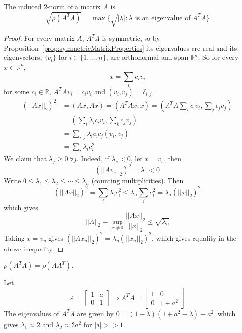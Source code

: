 \begin{theorem}
	The induced $2$-norm of a matrix $A$ is
	\[
		\sqrt{\rho(A^T A)} = \max \{ \sqrt{|\lambda|}: \lambda \text{ is an eigenvalue of } A^T A \}
	\]
\end{theorem}

\begin{proof}
	For every matrix $A$, $A^T A$ is symmetric, so by Proposition~\ref{prop:symmetricMatrixProperties} its eigenvalues are real and its eigenvectors, $\{ v_i \}$ for $i \in \{ 1, \dots, n \}$, are orthonormal and span $\mathbb{R}^n$. So for every $x \in \mathbb{R}^n$,
	\[
		x = \sum_i c_i v_i
	\]
	for some $c_i \in \mathbb{R}$, $A^T A v_i = c_i v_i$ and $(v_i, v_j) = \delta_{i, j}$.
	\[
		\begin{aligned}
			{(||Ax||_2)}^2
				& = (Ax, Ax) = (A^T A x, x) = \left( A^T A \sum_i c_i v_i, \sum_j c_j v_j \right) \\
				& = \left( \sum_i \lambda_i c_i v_i, \sum_k c_j v_j \right) \\
				& = \sum_{i, j} \lambda_i c_i c_j (v_i, v_j) \\
				& = \sum_i \lambda_i c_i^2
		\end{aligned}
	\]
	We claim that $\lambda_j \ge 0 \ \forall j$. Indeed, if $\lambda_s < 0$, let $x = v_s$, then
	\[
		{(||A v_s||_2)}^2 = \lambda_s < 0
	\]
	Write $0 \le \lambda_1 \le \lambda_2 \le \cdots \le \lambda_n$ (counting multiplicities). Then
	\[
		{(||Ax||_2)}^2 = \sum_i \lambda_i c_i^2 \le \lambda_n \sum_i c_i^2 = \lambda_n {(||x||_2)}^2
	\]
	which gives
	\[
		||A||_2 = \sup_{x \ne 0} \frac{||Ax||_2}{||x||_2} \le \sqrt{\lambda_n}
	\]
	Taking $x = v_n$ gives ${(||A x_n||_2)}^2 = \lambda_n {(||x_n||_2)}^2$, which gives equality in the above inequality.
\end{proof}

\begin{remark}
	$\rho(A^T A) = \rho(A A^T)$.
\end{remark}

\begin{example}
	Let
	\[
		A = \begin{bmatrix}
			1 & a \\
			0 & 1
		\end{bmatrix}
		\Longrightarrow
		A^T A = \begin{bmatrix}
			1 & 0 \\
			0 & 1 + a^2
		\end{bmatrix}
	\]
	The eigenvalues of $A^T A$ are given by $0 = (1 - \lambda) (1 + a^2 - \lambda) - a^2$, which gives $\lambda_1 \approx 2$ and $\lambda_2 \approx 2 a^2$ for $|a| >> 1$.
\end{example}

